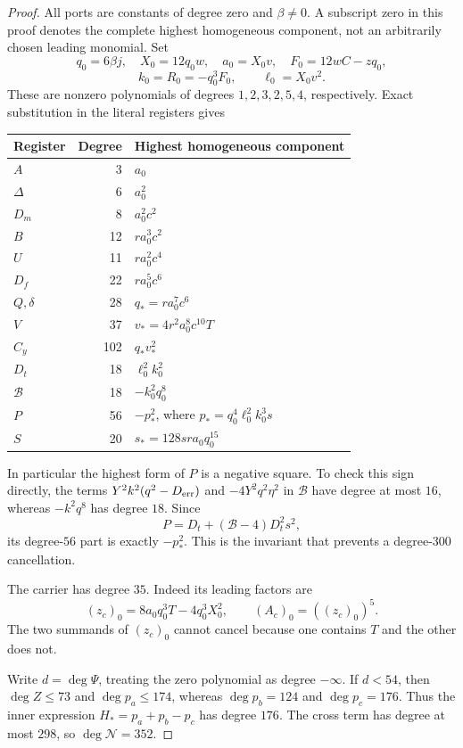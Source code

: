 \begin{proof}
All ports are constants of degree zero and $\beta\ne0$. A subscript zero
in this proof denotes the complete highest homogeneous component, not an
arbitrarily chosen leading monomial. Set
\[
 q_0=6\beta j,\quad X_0=12q_0w,\quad a_0=X_0v,
 \quad F_0=12wC-zq_0,
\]
\[
 k_0=R_0=-q_0^3F_0,\qquad \ell_0=X_0v^2.
\]
These are nonzero polynomials of degrees $1,2,3,2,5,4$, respectively.
Exact substitution in the literal registers gives
\begin{center}\small
\begin{tabular}{@{}lrl@{}}\toprule
Register & Degree & Highest homogeneous component\\\midrule
$A$ &3&$a_0$\\
$\Delta$ &6&$a_0^2$\\
$D_m$ &8&$a_0^2c^2$\\
$B$ &12&$ra_0^3c^2$\\
$U$ &11&$ra_0^2c^4$\\
$D_f$ &22&$ra_0^5c^6$\\
$Q,\delta$ &28&$q_*=ra_0^7c^6$\\
$V$ &37&$v_*=4r^2a_0^8c^{10}T$\\
$C_y$ &102&$q_*v_*^2$\\
$D_t$ &18&$\ell_0^2k_0^2$\\
$\mathcal B$ &18&$-k_0^2q_0^8$\\
$P$ &56&$-p_*^2$, where $p_*=q_0^4\ell_0^2k_0^3s$\\
$S$ &20&$s_*=128sra_0q_0^{15}$\\\bottomrule
\end{tabular}
\end{center}
In particular the highest form of $P$ is a negative square. To check this
sign directly, the terms $Y^2k^2(q^2-D_{\rm err})$ and
$-4Y^2q^2\eta^2$ in $\mathcal B$ have degree at most $16$, whereas
$-k^2q^8$ has degree $18$. Since
\[
 P=D_t+(\mathcal B-4)D_t^2s^2,
\]
its degree-$56$ part is exactly $-p_*^2$. This is the invariant that
prevents a degree-$300$ cancellation.

The carrier has degree $35$. Indeed its leading factors are
\[
 (z_c)_0=8a_0q_0^3T-4q_0^3X_0^2,\qquad
 (A_c)_0=((z_c)_0)^5.
\]
The two summands of $(z_c)_0$ cannot cancel because one contains $T$ and
the other does not.

Write $d=\deg\Psi$, treating the zero polynomial as degree $-\infty$.
If $d<54$, then $\deg Z\le73$ and $\deg p_a\le174$, whereas
$\deg p_b=124$ and $\deg p_c=176$. Thus the inner expression
$H_*=p_a+p_b-p_c$ has degree $176$. The cross term has degree at most
$298$, so $\deg\mathcal N=352$.


\end{proof}
